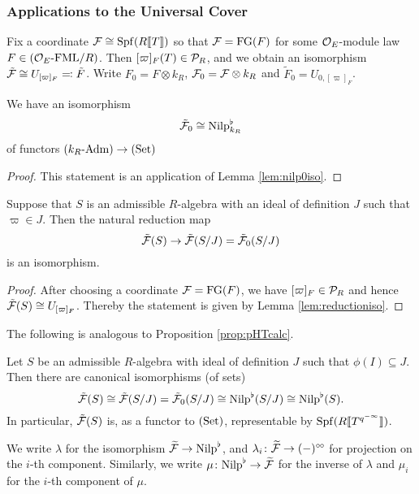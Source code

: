 \documentclass[../main.tex]{subfiles}
\begin{document}
\subsubsection{Applications to the Universal Cover} %
\label{ssub:The Universal Cover}

Fix a coordinate $\mathcal{F} \cong \operatorname{Spf}(R\llbracket T \rrbracket)$ so that $\mathcal{F} = \textnormal{FG}(F)$ for
some ${\mathcal{O}_E}$-module law $F \in {({\mathcal{O}_E}\textnormal-\allowbreak\mathrm{FML}/{R})}$. Then $[\varpi]_F(T) \in \mathcal{P}_R$, and
we obtain an isomorphism $\tilde {\mathcal{F}} \cong U_{[\varpi]_F} \eqqcolon \tilde F$.
Write $F_0 = F \otimes k_R$, $\mathcal{F}_0 = \mathcal{F} \otimes k_R$ and $\tilde F_0 = U_{0,
[\varpi]_F}$. 

\begin{lem}
  We have an isomorphism 
  \begin{equation*}
    \tilde {\mathcal{F}}_0 \cong {\mathrm{Nilp}}^\flat_{k_R}
  \end{equation*}
  of functors ${({k_R}\textnormal-\allowbreak\mathrm{Adm})} \to {(\mathrm{Set})}$
  \begin{proof}
    This statement is an application of Lemma \ref{lem:nilp0iso}.
  \end{proof}
\end{lem}

\begin{lem}
  Suppose that $S$ is an admissible $R$-algebra with an ideal of definition
  $J$ such that $\varpi \in J$. Then the natural reduction map
  \begin{equation*}
    \tilde {\mathcal{F}}(S) \to \tilde {\mathcal{F}}(S/J) = \tilde {\mathcal{F}}_0(S/J)
  \end{equation*}
  is an isomorphism.
  \begin{proof}[Proof]
    After choosing a coordinate $\mathcal{F} = \textnormal{FG}(F)$, we have $[\varpi]_F \in \mathcal{P}_R$
    and hence $\tilde {\mathcal{F}}(S) \cong U_{[\varpi]_F}$. Thereby the statement is
    given by Lemma \ref{lem:reductioniso}.
  \end{proof}
\end{lem}

The following is analogous to Proposition \ref{prop:pHTcalc}.
\begin{prop}\label{prop:UnivCoverReductionIso}
  Let $S$ be an admissible $R$-algebra with ideal of definition $J$ such that 
  $\phi(I) \subseteq J$. Then there are canonical isomorphisms (of sets)
  \begin{equation*}
    \tilde {\mathcal{F}}(S) \cong \tilde {\mathcal{F}}(S/J) = \tilde {\mathcal{F}}_0(S/J) \cong {\mathrm{Nilp}}^\flat(S/J) \cong
    {\mathrm{Nilp}}^\flat(S).
  \end{equation*}
  In particular, $\tilde {\mathcal{F}}(S)$ is, as a functor to ${(\mathrm{Set})}$, representable by
  $\operatorname{Spf}(R \llbracket T^{q^{-\infty}} \rrbracket)$.
\end{prop}
We write $\lambda$ for the isomorphism $\widetilde{\mathcal{F}} \to {\mathrm{Nilp}}^\flat$, and
$\lambda_i\colon \widetilde{\mathcal{F}} \to (-)^{\circ \hspace{-0.5pt} \circ}$ for projection on the $i$-th component.
Similarly, we write $\mu\colon {\mathrm{Nilp}}^\flat \to \widetilde{\mathcal{F}}$ for the inverse of 
$\lambda$ and $\mu_i$ for the $i$-th component of $\mu$. 
\end{document}
